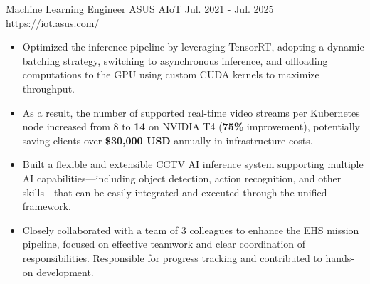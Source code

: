 

\begin{cventries}

\cventryexp
{Machine Learning Engineer} %
{ASUS AIoT} %
{Jul. 2021 - Jul. 2025} %
{https://iot.asus.com/}
{
    \begin{cvitems} %
        \begin{itemize}
            \item Optimized the inference pipeline by leveraging TensorRT, adopting a 
            dynamic batching strategy, switching to asynchronous inference, and offloading 
            computations to the GPU using custom CUDA kernels to maximize throughput. 
            \item As a result, the number of supported real-time video streams per 
            Kubernetes node increased from 8 to \textbf{14} on NVIDIA T4 (\textbf{75\%} improvement), potentially 
            saving clients over \textbf{\$30,000 USD} annually in infrastructure costs.
        \end{itemize}
        \begin{itemize}
            \item Built a flexible and extensible CCTV AI inference system 
            supporting multiple AI capabilities—including object detection, 
            action recognition, and other skills—that can be easily integrated 
            and executed through the unified framework.
            \item Closely collaborated with a team of 3 colleagues to enhance the 
            EHS mission pipeline, focused on effective teamwork and clear coordination of 
            responsibilities. Responsible for progress tracking and contributed to hands-on 
            development.
        \end{itemize}

\end{cvitems}}
\end{cventries}
